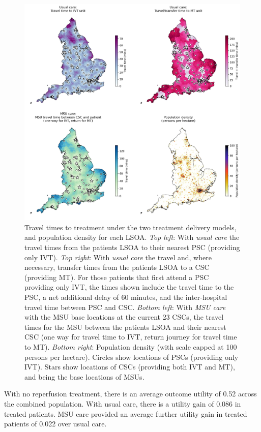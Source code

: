 \begin{figure}[h!]
    \centering
    \includegraphics[width=1.0\linewidth]{images/map_times.jpg}
    \caption{Travel times to treatment under the two treatment delivery models, and population density for each LSOA. \textit{Top left}: With \emph{usual care} the travel times from the patients LSOA to their nearest PSC (providing only IVT). \textit{Top right}: With \emph{usual care} the travel and, where necessary, transfer times from the patients LSOA to a CSC (providing MT). For those patients that first attend a PSC providing only IVT, the times shown include the travel time to the PSC, a net additional delay of 60 minutes, and the inter-hospital travel time between PSC and CSC. \textit{Bottom left}: With \emph{MSU care} with the MSU base locations at the current 23 CSCs, the travel times for the MSU between the patients LSOA and their nearest CSC (one way for travel time to IVT, return journey for travel time to MT). \textit{Bottom right}: Population density (with scale capped at 100 persons per hectare). Circles show locations of PSCs (providing only IVT). Stars show locations of CSCs (providing both IVT and MT), and being the base locations of MSUs.}
    \label{fig:map_times}
\end{figure}

With no reperfusion treatment, there is an average outcome utility of 0.52 across the combined population. With usual care, there is a utility gain of 0.086 in treated patients. MSU care provided an average further utility gain in treated patients of 0.022 over usual care.

